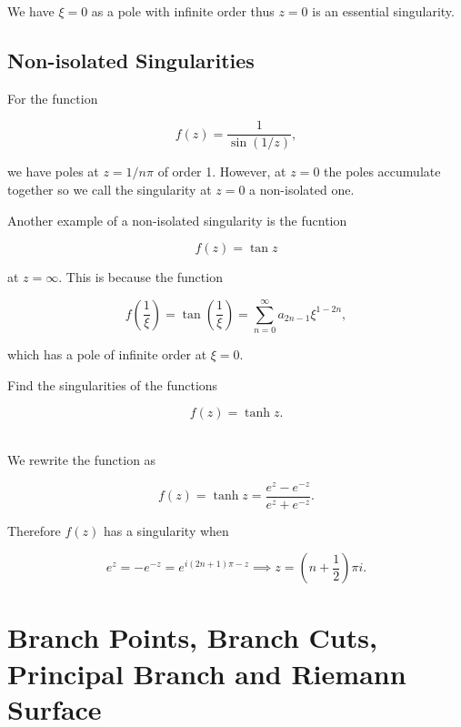\documentclass[english,a4paper,12pt]{report}
\begin{document}
We have \(\xi =0\) as a pole with infinite order thus \(z = 0\) is an essential singularity.

\subsection{Non-isolated Singularities}

For the function 

\begin{equation}
    f(z) = \frac{1}{\sin (1 /z)}, 
\end{equation}

we have poles at \(z = 1/n \pi \) of order 1. However, at \(z = 0\) the poles accumulate together so we call the singularity at \(z = 0\) a non-isolated one.

Another example of a non-isolated singularity is the fucntion 

\begin{equation}
    f(z) = \tan z 
\end{equation}

at \(z = \infty\). This is because the function 

\begin{equation}
    f\left( \frac{1}{\xi }  \right) = \tan \left( \frac{1}{\xi }  \right) = \sum_{n=0}^{\infty} a_{2n-1} \xi ^{1-2n},  
\end{equation}

which has a pole of infinite order at \(\xi = 0\). 

{Find the singularities of the functions 

\begin{equation}
    f(z) = \tanh z.
\end{equation}
~
}
{We rewrite the function as 

\begin{equation}
    f(z) = \tanh z = \frac{e^{z}-e^{-z}  }{e^{z}+e^{-z}  }. 
\end{equation}

Therefore \(f(z)\) has a singularity when

\begin{equation}
    e^{z} = - e^{-z} = e^{i(2n+1)\pi -z} \implies z = \left( n+\frac{1}{2}  \right) \pi i.   
\end{equation}



} 


\section{Branch Points, Branch Cuts, Principal Branch and Riemann Surface}
\end{document}

